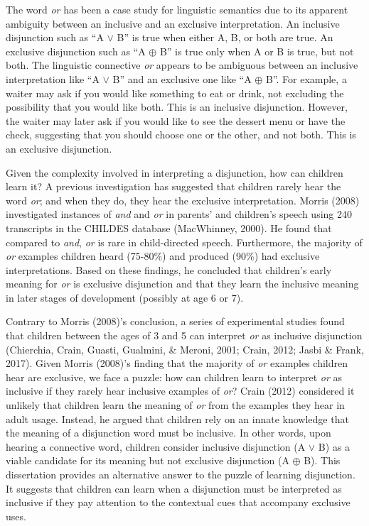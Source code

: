 \documentclass[oneside]{report}
\theoremstyle{definition}
\theoremstyle{definition}
\theoremstyle{definition}
\theoremstyle{remark}
\begin{document}
The word \emph{or} has been a case study for linguistic semantics due to
its apparent ambiguity between an inclusive and an exclusive
interpretation. An inclusive disjunction such as ``A \(\vee\) B'' is
true when either A, B, or both are true. An exclusive disjunction such
as ``A \(\oplus\) B'' is true only when A or B is true, but not both.
The linguistic connective \emph{or} appears to be ambiguous between an
inclusive interpretation like ``A \(\vee\) B'' and an exclusive one like
``A \(\oplus\) B''. For example, a waiter may ask if you would like
something to eat or drink, not excluding the possibility that you would
like both. This is an inclusive disjunction. However, the waiter may
later ask if you would like to see the dessert menu or have the check,
suggesting that you should choose one or the other, and not both. This
is an exclusive disjunction.

Given the complexity involved in interpreting a disjunction, how can
children learn it? A previous investigation has suggested that children
rarely hear the word \emph{or}; and when they do, they hear the
exclusive interpretation. Morris (2008) investigated instances of
\emph{and} and \emph{or} in parents' and children's speech using 240
transcripts in the CHILDES database (MacWhinney, 2000). He found that
compared to \emph{and}, \emph{or} is rare in child-directed speech.
Furthermore, the majority of \emph{or} examples children heard (75-80\%)
and produced (90\%) had exclusive interpretations. Based on these
findings, he concluded that children's early meaning for \emph{or} is
exclusive disjunction and that they learn the inclusive meaning in later
stages of development (possibly at age 6 or 7).

Contrary to Morris (2008)'s conclusion, a series of experimental studies
found that children between the ages of 3 and 5 can interpret \emph{or}
as inclusive disjunction (Chierchia, Crain, Guasti, Gualmini, \& Meroni,
2001; Crain, 2012; Jasbi \& Frank, 2017). Given Morris (2008)'s finding
that the majority of \emph{or} examples children hear are exclusive, we
face a puzzle: how can children learn to interpret \emph{or} as
inclusive if they rarely hear inclusive examples of \emph{or}? Crain
(2012) considered it unlikely that children learn the meaning of
\emph{or} from the examples they hear in adult usage. Instead, he argued
that children rely on an innate knowledge that the meaning of a
disjunction word must be inclusive. In other words, upon hearing a
connective word, children consider inclusive disjunction (A \(\vee\) B)
as a viable candidate for its meaning but not exclusive disjunction (A
\(\oplus\) B). This dissertation provides an alternative answer to the
puzzle of learning disjunction. It suggests that children can learn when
a disjunction must be interpreted as inclusive if they pay attention to
the contextual cues that accompany exclusive uses.
\end{document}
